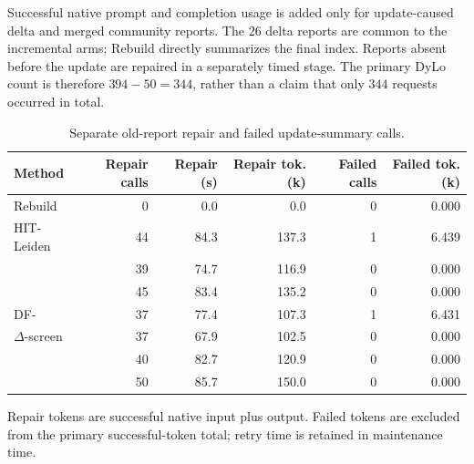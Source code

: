  Successful native prompt and
completion usage is added only for update-caused delta and merged community
reports. The $26$ delta reports are common to the incremental arms; Rebuild
directly summarizes the final index. Reports absent before the update are
repaired in a separately timed stage. The primary DyLo count is therefore
$394-50=344$, rather than a claim that only $344$ requests occurred in total.
\begin{table}[tb]\centering
\caption{Separate old-report repair and failed update-summary calls.}
\label{tab:maintenance-exclusions}
\footnotesize
\setlength{\tabcolsep}{0.25em}
\begin{tabular*}{\linewidth}{@{\extracolsep{\fill}}lrrrrr@{}}
\toprule
Method & Repair calls & Repair (s) & Repair tok. (k) & Failed calls & Failed tok. (k) \\
\midrule
Rebuild & 0 & 0.0 & 0.0 & 0 & 0.000 \\
HIT-Leiden & 44 & 84.3 & 137.3 & 1 & 6.439 \\
\DynaMo{} & 39 & 74.7 & 116.9 & 0 & 0.000 \\
\QCA{} & 45 & 83.4 & 135.2 & 0 & 0.000 \\
DF-\Louvain{} & 37 & 77.4 & 107.3 & 1 & 6.431 \\
$\Delta$-screen & 37 & 67.9 & 102.5 & 0 & 0.000 \\
\Batch{} & 40 & 82.7 & 120.9 & 0 & 0.000 \\
\DyLo{} & 50 & 85.7 & 150.0 & 0 & 0.000 \\
\bottomrule
\end{tabular*}
\par\smallskip\raggedright
Repair tokens are successful native input plus output. Failed tokens are excluded from the primary successful-token total; retry time is retained in maintenance time.
\end{table}
